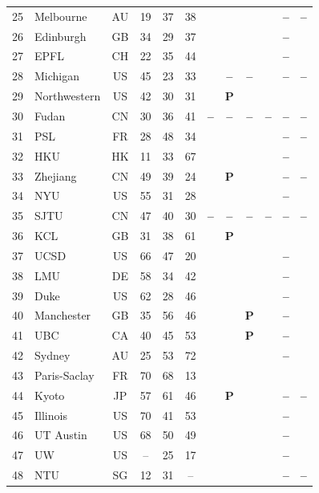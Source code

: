 \documentclass[pdflatex,sn-basic,Numbered,iicol]{sn-jnl}
\newcommand{\si}{\ding{51}}
\newcommand{\no}{\textcolor{gris}{\textbf{--}}}
\newcommand{\pc}{\textbf{P}}
\theoremstyle{thmstyleone}
\theoremstyle{thmstyletwo}
\theoremstyle{thmstylethree}
\begin{document}
\begin{appendices}
\begin{longtable}{@{}r l c c c c c c c c c c@{}}
	25 & Melbourne & AU & 19 & 37 & 38 & \si & \si & \si & \si & \no & \no \\
	26 & Edinburgh & GB & 34 & 29 & 37 & \si & \si & \si & \si & \no & \si \\
	27 & EPFL & CH & 22 & 35 & 44 & \si & \si & \si & \si & \no & \si \\
	28 & Michigan & US & 45 & 23 & 33 & \si & \no & \no & \si & \no & \no \\
	29 & Northwestern & US & 42 & 30 & 31 & \si & \pc & \si & \si & \si & \si \\
	30 & Fudan & CN & 30 & 36 & 41 & \no & \no & \no & \no & \no & \no \\
	31 & PSL & FR & 28 & 48 & 34 & \si & \si & \si & \si & \no & \no \\
	32 & HKU & HK & 11 & 33 & 67 & \si & \si & \si & \si & \no & \si \\
	33 & Zhejiang & CN & 49 & 39 & 24 & \si & \pc & \si & \si & \no & \no \\
	34 & NYU & US & 55 & 31 & 28 & \si & \si & \si & \si & \no & \si \\
	35 & SJTU & CN & 47 & 40 & 30 & \no & \no & \no & \no & \no & \no \\
	36 & KCL & GB & 31 & 38 & 61 & \si & \pc & \si & \si & \si & \si \\
	37 & UCSD & US & 66 & 47 & 20 & \si & \si & \si & \si & \no & \si \\
	38 & LMU & DE & 58 & 34 & 42 & \si & \si & \si & \si & \no & \si \\
	39 & Duke & US & 62 & 28 & 46 & \si & \si & \si & \si & \no & \si \\
	40 & Manchester & GB & 35 & 56 & 46 & \si & \si & \pc & \si & \no & \si \\
	41 & UBC & CA & 40 & 45 & 53 & \si & \si & \pc & \si & \no & \si \\
	42 & Sydney & AU & 25 & 53 & 72 & \si & \si & \si & \si & \no & \si \\
	43 & Paris-Saclay & FR & 70 & 68 & 13 & \si & \si & \si & \si & \si & \si \\
	44 & Kyoto & JP & 57 & 61 & 46 & \si & \pc & \si & \si & \no & \no \\
	45 & Illinois & US & 70 & 41 & 53 & \si & \si & \si & \si & \no & \si \\
	46 & UT Austin & US & 68 & 50 & 49 & \si & \si & \si & \si & \no & \si \\
	47 & UW & US & -- & 25 & 17 & \si & \si & \si & \si & \no & \si \\
	48 & NTU & SG & 12 & 31 & -- & \si & \si & \si & \si & \no & \no \\

\end{longtable}
\end{appendices}
\end{document}
